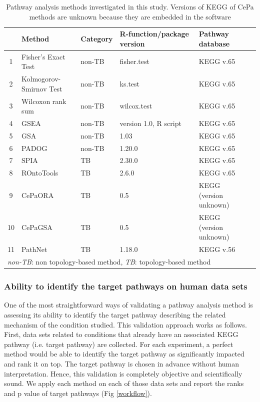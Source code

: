 \begin{table}

\centering
\caption{Pathway analysis methods investigated in this study. Versions of KEGG of CePa methods are unknown because they are embedded in the software\label{table:PAmethods}} 
\small
\begin{tabular}{@{}clllll@{}}\hline
 & Method & Category  & R-function/package version & Pathway database \\\hline
 1 & Fisher's Exact Test &	non-TB 	& fisher.test & KEGG v.65\\ 
 2 & Kolmogorov-Smirnov Test& non-TB & ks.test & KEGG v.65\\
3 & Wilcoxon rank sum	& non-TB 	& wilcox.test &  KEGG v.65\\
4 & GSEA &	non-TB & version 1.0, R script & KEGG v.65\\
5 & GSA &	non-TB & 1.03 & KEGG v.65\\
6 & PADOG &	non-TB & 1.20.0 & KEGG v.65\\
7 & SPIA &	TB  & 2.30.0 & KEGG v.65\\
8 & ROntoTools &		TB & 2.6.0 & KEGG v.65\\
9 & CePaORA &	TB & 0.5 & KEGG (version unknown)\\
10 & CePaGSA &	TB & 0.5 & KEGG (version unknown)\\
11 & PathNet &	TB & 1.18.0 & KEGG v.56\\
\hline
\multicolumn{5}{l}{\textit{non-TB}: non topology-based method, \textit{TB}: topology-based method}

\end{tabular}
\end{table}


\subsubsection{Ability to identify the target pathways on human data sets}

One of the most straightforward ways of validating a pathway analysis method is assessing its ability to identify the target pathway describing the related mechanism of the condition studied. 
This validation approach works as follows. First, data sets related to  conditions that already have an associated KEGG pathway (i.e. target pathway) are collected. For each experiment, a perfect method would be able to identify the target pathway as significantly impacted and rank it on top. The target pathway is chosen in advance without human interpretation. Hence, this validation is completely objective and scientifically sound. We apply each method on each of those data sets and report the ranks and p value of target pathways (Fig \ref{workflow}).


